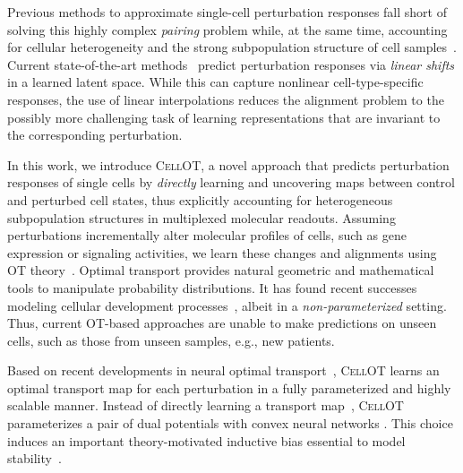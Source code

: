  Previous methods to approximate single-cell perturbation responses fall short of solving this highly complex \emph{pairing} problem while, at the same time, accounting for cellular heterogeneity and the strong subpopulation structure of cell samples~\citep{wu2021single,gonzalez2020tumor,li2022single}. 
Current state-of-the-art methods~\citep{lopez2018scvi, lotfollahi2019scgen, yang2020predicting} predict perturbation responses via \emph{linear shifts} in a learned %
latent space.
While this can capture nonlinear cell-type-specific responses, the use of linear interpolations reduces the alignment problem to the possibly more challenging task of learning representations that are invariant to the corresponding perturbation. 

 In this work, we introduce \textsc{CellOT}, a novel approach that predicts perturbation responses of single cells by \emph{directly} learning and uncovering maps between control and perturbed cell states, thus explicitly accounting for heterogeneous subpopulation structures in multiplexed molecular readouts.
Assuming perturbations incrementally alter molecular profiles of cells, such as gene expression or signaling activities, we learn these changes and alignments using \acrlong{OT} theory~\citep{villani2009optimal}. Optimal transport provides natural geometric and mathematical tools to manipulate probability distributions. It has found recent successes modeling cellular development processes~\citep{lavenant2021towards, schiebinger2019optimal}, albeit in a {\em non-parameterized} setting. Thus, current OT-based approaches are unable to make predictions on unseen cells, such as those from unseen samples, e.g., new patients. 

 Based on recent developments in neural optimal transport~\citep{makkuva2020optimal}, \textsc{CellOT} learns an optimal transport map for each perturbation in a fully parameterized and highly scalable manner. Instead of directly learning a transport map~\citep{korotin2021wasserstein, yang2018scalable, prasad2020optimal}, \textsc{CellOT} parameterizes a pair of dual potentials with convex neural networks \citep{amos2017input}. This choice induces an important theory-motivated inductive bias essential to model stability~\citep{makkuva2020optimal}. 

